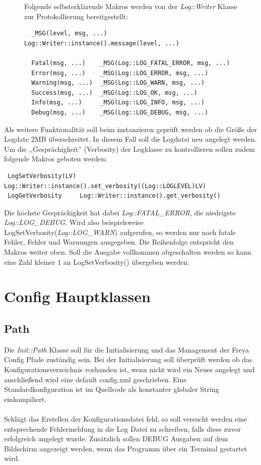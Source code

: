 \begin{figure}[htb!]
    Folgende selbsterklärende Makros werden von der \emph{Log::Writer} Klasse zur Protokollierung bereitgestellt:

  \begin{verbatim}
  _MSG(level, msg, ...) Log::Writer::instance().message(level, ...)

  Fatal(msg, ...)    _MSG(Log::LOG_FATAL_ERROR, msg, ...)
  Error(msg, ...)    _MSG(Log::LOG_ERROR, msg, ...)
  Warning(msg, ...)  _MSG(Log::LOG_WARN, msg, ...)
  Success(msg, ...)  _MSG(Log::LOG_OK, msg, ...)
  Info(msg, ...)     _MSG(Log::LOG_INFO, msg, ...)
  Debug(msg, ...)    _MSG(Log::LOG_DEBUG, msg, ...)
  \end{verbatim}
\end{figure}

Als weitere Funktionalität soll beim instanzieren geprüft werden ob die Größe der Logdate 2MB überschreitet. In diesem Fall soll die Logdatei neu angelegt werden.
Um die ,,Gesprächigkeit'' (Verbosity) der Logklasse zu kontrollieren sollen zudem folgende Makros geboten werden:
\begin{verbatim}
 LogSetVerbosity(LV) Log::Writer::instance().set_verbosity((Log::LOGLEVEL)LV)
 LogGetVerbosity     Log::Writer::instance().get_verbosity()
\end{verbatim}
Die höchste Gesprächigkeit hat dabei \emph{Log::FATAL\_ERROR}, die niedrigste \emph{Log::LOG\_DEBUG}. Wird also beispielsweise LogSetVerbosity(\emph{Log::LOG\_WARN}) aufgerufen, so
werden nur noch fatale Fehler, Fehler und Warnungen ausgegeben. Die Reihenfolge entspricht den Makros weiter oben.
Soll die Ausgabe vollkommen abgeschalten werden so kann eine Zahl kleiner 1 an LogSetVerbosity() übergeben werden.


\section{Config Hauptklassen}

\subsection{Path}
Die \emph{Init::Path} Klasse soll für die Initialisierung und das Management der Freya Config Pfade zuständig sein.
Bei der Initialisierung soll überprüft werden ob das Konfigurationsverzeichnis vorhanden ist, wenn nicht wird ein Neues
angelegt und anschließend wird eine default config.xml geschrieben. Eine Standardkonfiguration ist im Quellcode als 
konstanter globaler String einkompiliert.
\\
\\
Schlägt das Erstellen der Konfigurationsdatei fehl, so soll versucht werden eine entsprechende Fehlermeldung in die Log Datei zu schreiben, 
falls diese zuvor erfolgreich angelegt wurde. Zusätzlich sollen DEBUG Ausgaben auf dem Bildschirm angezeigt werden, wenn das Programm
über ein Terminal gestartet wird.

